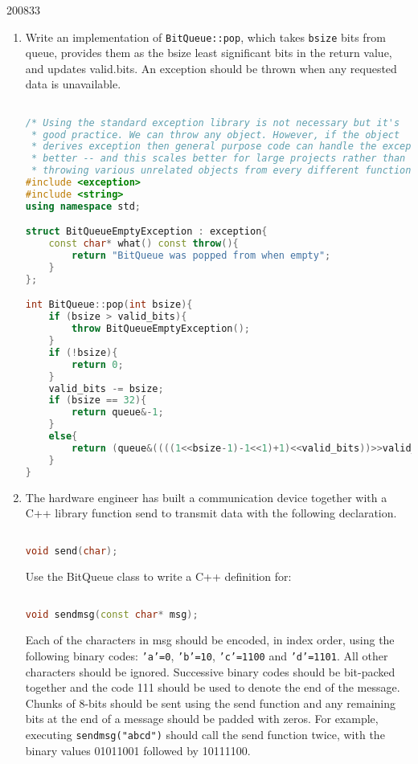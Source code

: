 \documentclass[10pt,\jkfside,a4paper]{article}
\begin{document}
\begin{examquestion}{2008}{3}{3}
\begin{enumerate}[label=(\alph*)]
\item Write an implementation of \texttt{BitQueue::pop}, which takes
\texttt{bsize} bits from queue, provides them as the bsize least significant
bits in the return value, and updates valid.bits. An exception should be
thrown when any requested data is unavailable.

\begin{lstlisting}[language=C++]

/* Using the standard exception library is not necessary but it's
 * good practice. We can throw any object. However, if the object
 * derives exception then general purpose code can handle the exception
 * better -- and this scales better for large projects rather than
 * throwing various unrelated objects from every different function */
#include <exception>
#include <string>
using namespace std;

struct BitQueueEmptyException : exception{
	const char* what() const throw(){
		return "BitQueue was popped from when empty";
	}
};

int BitQueue::pop(int bsize){
    if (bsize > valid_bits){
        throw BitQueueEmptyException();
    }
    if (!bsize){
        return 0;
    }
    valid_bits -= bsize;
    if (bsize == 32){
    	return queue&-1;
    }
    else{
    	return (queue&((((1<<bsize-1)-1<<1)+1)<<valid_bits))>>valid_bits;
    }
}

\end{lstlisting}

\item The hardware engineer has built a communication device together with a
C++ library function send to transmit data with the following declaration.

\begin{lstlisting}[language=C++]

void send(char);

\end{lstlisting}

Use the BitQueue class to write a C++ definition for:

\begin{lstlisting}[language=C++]

void sendmsg(const char* msg);

\end{lstlisting}

Each of the characters in msg should be encoded, in index order, using the
following binary codes: \texttt{'a'=0}, \texttt{'b'=10}, \texttt{'c'=1100} and
\texttt{'d'=1101}. All other characters should be ignored. Successive binary codes
should be bit-packed together and the code 111 should be used to denote the
end of the message. Chunks of 8-bits should be sent using the send function
and any remaining bits at the end of a message should be padded with zeros.
For example, executing \texttt{sendmsg("abcd")} should call the send
function twice, with the binary values 01011001 followed by 10111100.


\end{enumerate}
\end{examquestion}
\end{document}
